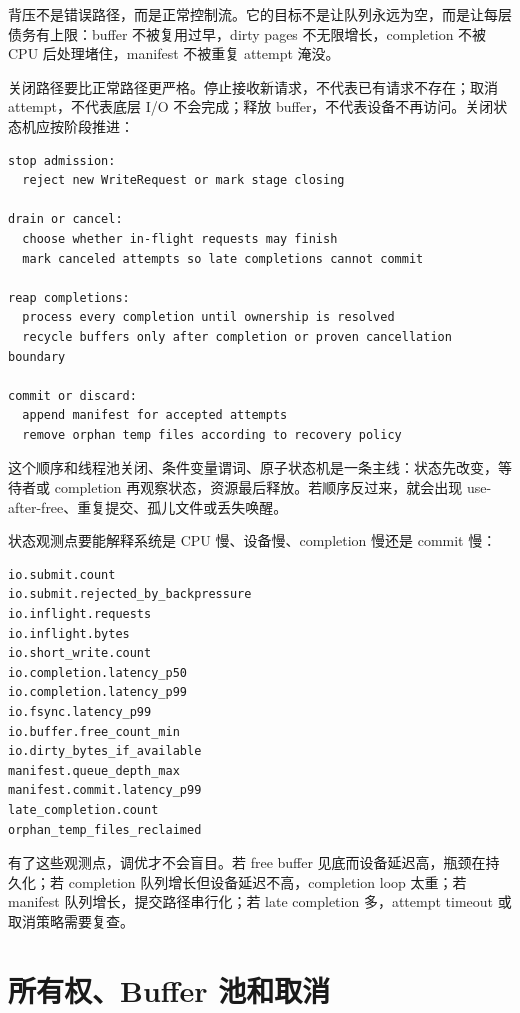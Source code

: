 背压不是错误路径，而是正常控制流。它的目标不是让队列永远为空，而是让每层债务有上限：buffer 不被复用过早，dirty pages 不无限增长，completion 不被 CPU 后处理堵住，manifest 不被重复 attempt 淹没。

关闭路径要比正常路径更严格。停止接收新请求，不代表已有请求不存在；取消 attempt，不代表底层 I/O 不会完成；释放 buffer，不代表设备不再访问。关闭状态机应按阶段推进：

\begin{lstlisting}[numbers=none,caption={I/O 流水线关闭顺序}]
stop admission:
  reject new WriteRequest or mark stage closing

drain or cancel:
  choose whether in-flight requests may finish
  mark canceled attempts so late completions cannot commit

reap completions:
  process every completion until ownership is resolved
  recycle buffers only after completion or proven cancellation boundary

commit or discard:
  append manifest for accepted attempts
  remove orphan temp files according to recovery policy
\end{lstlisting}

这个顺序和线程池关闭、条件变量谓词、原子状态机是一条主线：状态先改变，等待者或 completion 再观察状态，资源最后释放。若顺序反过来，就会出现 use-after-free、重复提交、孤儿文件或丢失唤醒。

状态观测点要能解释系统是 CPU 慢、设备慢、completion 慢还是 commit 慢：

\begin{lstlisting}[numbers=none,caption={异步写流水线观测点}]
io.submit.count
io.submit.rejected_by_backpressure
io.inflight.requests
io.inflight.bytes
io.short_write.count
io.completion.latency_p50
io.completion.latency_p99
io.fsync.latency_p99
io.buffer.free_count_min
io.dirty_bytes_if_available
manifest.queue_depth_max
manifest.commit.latency_p99
late_completion.count
orphan_temp_files_reclaimed
\end{lstlisting}

有了这些观测点，调优才不会盲目。若 free buffer 见底而设备延迟高，瓶颈在持久化；若 completion 队列增长但设备延迟不高，completion loop 太重；若 manifest 队列增长，提交路径串行化；若 late completion 多，attempt timeout 或取消策略需要复查。

\section{所有权、Buffer 池和取消}

